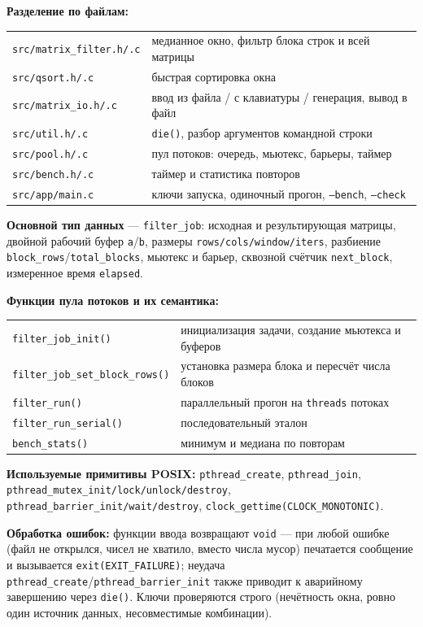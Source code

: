 \textbf{Разделение по файлам:}

\begin{center}
\begin{tabular}{ll}
\texttt{src/matrix\_filter.h/.c} & медианное окно, фильтр блока строк и всей матрицы \\
\texttt{src/qsort.h/.c}          & быстрая сортировка окна \\
\texttt{src/matrix\_io.h/.c}     & ввод из файла / с клавиатуры / генерация, вывод в файл \\
\texttt{src/util.h/.c}           & \texttt{die()}, разбор аргументов командной строки \\
\texttt{src/pool.h/.c}           & пул потоков: очередь, мьютекс, барьеры, таймер \\
\texttt{src/bench.h/.c}          & таймер и статистика повторов \\
\texttt{src/app/main.c}          & ключи запуска, одиночный прогон, \texttt{--bench}, \texttt{--check} \\
\end{tabular}
\end{center}

\textbf{Основной тип данных} --- \texttt{filter\_job}: исходная и результирующая матрицы,
двойной рабочий буфер \texttt{a}/\texttt{b}, размеры \texttt{rows/cols/window/iters},
разбиение \texttt{block\_rows}/\texttt{total\_blocks}, мьютекс и барьер, сквозной счётчик
\texttt{next\_block}, измеренное время \texttt{elapsed}.

\textbf{Функции пула потоков и их семантика:}

\begin{center}
\begin{tabular}{ll}
\texttt{filter\_job\_init()}        & инициализация задачи, создание мьютекса и буферов \\
\texttt{filter\_job\_set\_block\_rows()} & установка размера блока и пересчёт числа блоков \\
\texttt{filter\_run()}              & параллельный прогон на \texttt{threads} потоках \\
\texttt{filter\_run\_serial()}      & последовательный эталон \\
\texttt{bench\_stats()}             & минимум и медиана по повторам \\
\end{tabular}
\end{center}

\textbf{Используемые примитивы POSIX:}
\texttt{pthread\_create}, \texttt{pthread\_join},
\texttt{pthread\_mutex\_init/lock/unlock/destroy},
\texttt{pthread\_barrier\_init/wait/destroy},
\texttt{clock\_gettime(CLOCK\_MONOTONIC)}.

\textbf{Обработка ошибок:} функции ввода возвращают \texttt{void} --- при любой ошибке
(файл не открылся, чисел не хватило, вместо числа мусор) печатается сообщение и вызывается
\texttt{exit(EXIT\_FAILURE)}; неудача \texttt{pthread\_create}/\texttt{pthread\_barrier\_init}
также приводит к аварийному завершению через \texttt{die()}. Ключи проверяются строго
(нечётность окна, ровно один источник данных, несовместимые комбинации).
